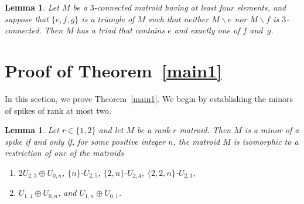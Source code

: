 \documentclass[11pt]{amsart}
\newtheorem{lemma}[theorem]{Lemma}
\numberwithin{equation}{section} %
\begin{document}
\begin{lemma}
\label{lem: tt}
Let $M$ be a $3$-connected matroid having at least four elements, and suppose that $\{e, f, g\}$ is a triangle of $M$ such that neither $M\backslash e$ nor $M\backslash f$ is $3$-connected. Then $M$ has a triad that contains $e$ and exactly one of $f$ and~$g$.
\end{lemma}

\section{Proof of Theorem~\ref{main1}}
\label{proof1}

In this section, we prove Theorem~\ref{main1}. We begin by establishing the minors of spikes of rank at most two.

\begin{lemma}
\label{lem:smaller_spike_minors}
Let $r\in \{1, 2\}$ and let $M$ be a rank-$r$ matroid. Then $M$ is a minor of a spike if and only if, for some positive integer $n$, the matroid $M$ is isomorphic to a restriction of one of the matroids
\begin{enumerate}[{\rm (i)}]
\item $2U_{2, 3}\oplus U_{0, n}$, $\{n\}$-$U_{2,5}$, $\{2, n\}$-$U_{2,4}$, $\{2, 2, n\}$-$U_{2,3}$,

\item $U_{1, 4}\oplus U_{0, n}$, and $U_{1, n}\oplus U_{0, 1}$.
\end{enumerate}
\end{lemma}
\end{document}
